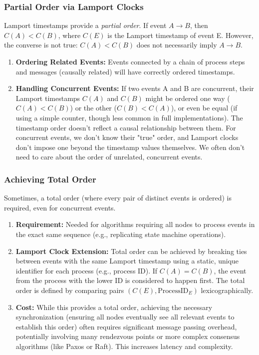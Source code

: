 \subsubsection{Partial Order via Lamport Clocks}
Lamport timestamps provide a \textit{partial order}. If event \( A \rightarrow B \), then \( C(A) < C(B) \), where \( C(E) \) is the Lamport timestamp of event E. However, the converse is not true: \( C(A) < C(B) \) does not necessarily imply \( A \rightarrow B \).
\begin{enumerate}[label=\roman*), noitemsep]
    \item \textbf{Ordering Related Events:} Events connected by a chain of process steps and messages (causally related) will have correctly ordered timestamps.
    \item \textbf{Handling Concurrent Events:} If two events A and B are concurrent, their Lamport timestamps \( C(A) \) and \( C(B) \) might be ordered one way (\( C(A) < C(B) \)) or the other (\( C(B) < C(A) \)), or even be equal (if using a simple counter, though less common in full implementations). The timestamp order doesn't reflect a causal relationship between them. For concurrent events, we don't know their "true" order, and Lamport clocks don't impose one beyond the timestamp values themselves. We often don't need to care about the order of unrelated, concurrent events.
\end{enumerate}

\subsubsection{Achieving Total Order}
Sometimes, a total order (where every pair of distinct events is ordered) is required, even for concurrent events.
\begin{enumerate}[label=\roman*), noitemsep]
    \item \textbf{Requirement:} Needed for algorithms requiring all nodes to process events in the exact same sequence (e.g., replicating state machine operations).
    \item \textbf{Lamport Clock Extension:} Total order can be achieved by breaking ties between events with the same Lamport timestamp using a static, unique identifier for each process (e.g., process ID). If \( C(A) = C(B) \), the event from the process with the lower ID is considered to happen first. The total order is defined by comparing pairs \( (C(E), \text{ProcessID}_E) \) lexicographically.
    \item \textbf{Cost:} While this provides a total order, achieving the necessary synchronization (ensuring all nodes eventually see all relevant events to establish this order) often requires significant message passing overhead, potentially involving many rendezvous points or more complex consensus algorithms (like Paxos or Raft). This increases latency and complexity.
\end{enumerate}

